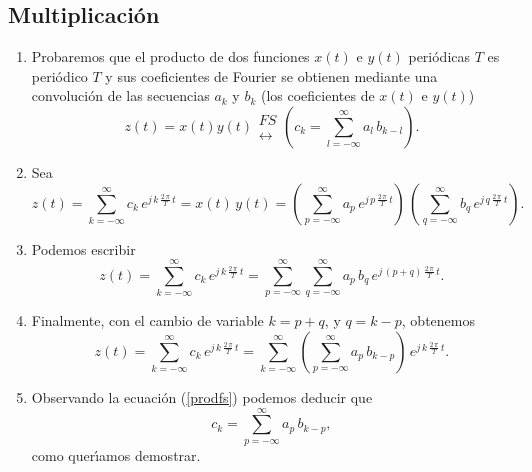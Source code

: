\subsection{Multiplicaci\'{o}n}

\begin{enumerate}
\item Probaremos que el producto de dos funciones $x(t)$ e $y(t)$
  peri\'{o}dicas $T$ es peri\'{o}dico $T$ y sus coeficientes de
  Fourier se obtienen mediante una convoluci\'{o}n de las secuencias
  $a_{k}$ y $b_{k}$ (los coeficientes de $x(t)$ e $y(t)$)
\begin{equation}
z\left( t\right) =
x\left( t\right) y\left( t\right) \begin{array}{l}
FS \\ 
\longleftrightarrow
\end{array}
\left( c_{k}=\sum_{l=-\infty }^{\infty } a_{l} \, b_{k-l}\right).
\end{equation}

\item Sea 
\begin{equation}
z(t) = \sum_{k = -\infty}^{\infty} c_{k} \, e^{j \, k \, \frac{2 \, \pi}{T}  \, t} 
= x(t) \, y(t) = 
\left( \sum_{p = -\infty}^{\infty} a_{p} \, e^{j \, p \, \frac{2
      \,\pi}{T} \, t} \right) \, 
\left( \sum_{q = -\infty}^{\infty} b_{q} \, e^{j \, q \, \frac{2 \,
      \pi}{T} \, t} \right).
\end{equation}

\item Podemos escribir
\begin{equation}
z(t) = \sum_{k = -\infty}^{\infty} c_{k} \, e^{j \, k \, \frac{2 \,
    \pi}{T}  \, t} = 
 \sum_{p = -\infty}^{\infty} \sum_{q = -\infty}^{\infty} a_{p}
  \, b_{q} \, e^{j \, (p + q) \, \frac{2 \,\pi}{T} \, t}.
\end{equation}

\item Finalmente, con el cambio de variable $k = p + q$, y $q = k -
  p$, obtenemos
\begin{equation}
z(t) = \sum_{k = -\infty}^{\infty} c_{k} \, e^{j \, k \, \frac{2 \, \pi}{T}  \, t} = 
\sum_{k = -\infty}^{\infty} \left( \sum_{p = -\infty}^{\infty} a_{p}
  \, b_{k-p} \right) \, e^{j \, k \, \frac{2 \,\pi}{T} \, t}. \label{prodfs}
\end{equation}

\item Observando la ecuaci\'{o}n (\ref{prodfs}) podemos deducir que 
\begin{equation}
c_{k} = \sum_{p = -\infty}^{\infty} a_{p} \, b_{k-p},
\end{equation}
como quer\'{\i}amos demostrar.
\end{enumerate}

